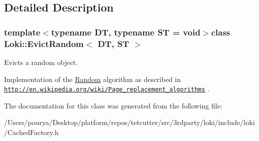 \subsection{Detailed Description}
\subsubsection*{template$<$typename D\+T, typename S\+T = void$>$class Loki\+::\+Evict\+Random$<$ D\+T, S\+T $>$}

Evicts a random object. 

Implementation of the \hyperlink{classRandom}{Random} algorithm as described in \href{http://en.wikipedia.org/wiki/Page_replacement_algorithms}{\tt http\+://en.\+wikipedia.\+org/wiki/\+Page\+\_\+replacement\+\_\+algorithms} . 

The documentation for this class was generated from the following file\+:\begin{DoxyCompactItemize}
\item 
/\+Users/pourya/\+Desktop/platform/repos/tetcutter/src/3rdparty/loki/include/loki/Cached\+Factory.\+h\end{DoxyCompactItemize}
